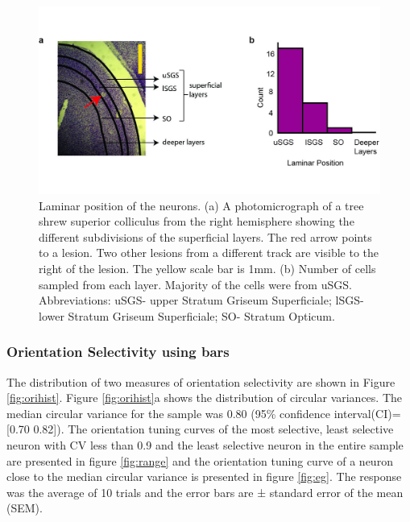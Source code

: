 	\begin{figure}[]
		
		\includegraphics[width=\linewidth]{superiorcolliculus/anatpos.jpg}
		\caption{Laminar position of the neurons. (a) A photomicrograph of a tree shrew superior colliculus from the right hemisphere showing the different subdivisions of the superficial layers. The red arrow points to a lesion. Two other lesions from a different track are visible to the right of the lesion. The yellow scale bar is 1mm. (b) Number of cells sampled from each layer. Majority of the cells were from uSGS. Abbreviations: uSGS- upper Stratum Griseum Superficiale; lSGS- lower Stratum Griseum Superficiale; SO- Stratum Opticum.}
		\label{fig:anatpos}
	\end{figure}
	
	
	
	\subsubsection{Orientation Selectivity using bars}
	
	The distribution of two measures of orientation selectivity are shown in Figure \ref{fig:orihist}. Figure \ref{fig:orihist}a shows the distribution of circular variances. The median circular variance for the sample was 0.80 (95\% confidence interval(CI)= [0.70 0.82]). The orientation tuning curves of the most selective, least selective neuron with CV less than 0.9 and the least selective neuron in the entire sample are presented in figure \ref{fig:range} and the orientation tuning curve of a neuron close to the median circular variance is presented in figure \ref{fig:eg}. The response was the average of 10 trials and the error bars are ± standard error of the mean (SEM).
	
